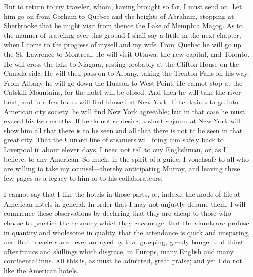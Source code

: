 But to return to my traveler, whom, having brought so far, I must
send on.  Let him go on from Gorham to Quebec and the heights of
Abraham, stopping at Sherbrooke that he might visit from thence the
Lake of Memphra Magog.  As to the manner of traveling over this
ground I shall say a little in the next chapter, when I come to the
progress of myself and my wife.  From Quebec he will go up the St.
Lawrence to Montreal.  He will visit Ottawa, the new capital, and
Toronto.  He will cross the lake to Niagara, resting probably at
the Clifton House on the Canada side.  He will then pass on to
Albany, taking the Trenton Falls on his way.  From Albany he will
go down the Hudson to West Point.  He cannot stop at the Catskill
Mountains, for the hotel will be closed.  And then he will take the
river boat, and in a few hours will find himself at New York.  If
he desires to go into American city society, he will find New York
agreeable; but in that case he must exceed his two months.  If he
do not so desire, a short sojourn at New York will show him all
that there is to be seen and all that there is not to be seen in
that great city.  That the Cunard line of steamers will bring him
safely back to Liverpool in about eleven days, I need not tell to
any Englishman, or, as I believe, to any American.  So much, in the
spirit of a guide, I vouchsafe to all who are willing to take my
counsel---thereby anticipating Murray, and leaving these few pages
as a legacy to him or to his collaborateurs.

I cannot say that I like the hotels in those parts, or, indeed, the
mode of life at American hotels in general.  In order that I may
not unjustly defame them, I will commence these observations by
declaring that they are cheap to those who choose to practice the
economy which they encourage, that the viands are profuse in
quantity and wholesome in quality, that the attendance is quick and
unsparing, and that travelers are never annoyed by that grasping,
greedy hunger and thirst after francs and shillings which disgrace,
in Europe, many English and many continental inns.  All this is, as
must be admitted, great praise; and yet I do not like the American
hotels.


